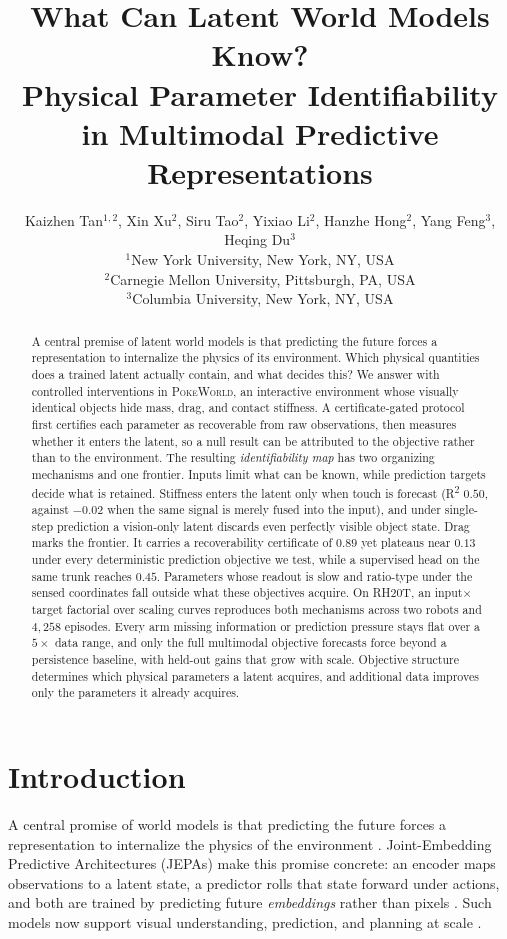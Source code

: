 \documentclass{article} %
\title{What Can Latent World Models Know? \\ Physical Parameter Identifiability \\ in Multimodal Predictive Representations}
\author{Kaizhen Tan$^{1,2}$, Xin Xu$^{2}$, Siru Tao$^{2}$, Yixiao Li$^{2}$,
Hanzhe Hong$^{2}$, Yang Feng$^{3}$, Heqing Du$^{3}$ \\
$^{1}$New York University, New York, NY, USA \\
$^{2}$Carnegie Mellon University, Pittsburgh, PA, USA \\
$^{3}$Columbia University, New York, NY, USA}
\newcommand{\pokeworld}{\textsc{PokeWorld}}
\begin{document}
\maketitle

\begin{abstract}
A central premise of latent world models is that predicting the future
forces a representation to internalize the physics of its environment.
Which physical quantities does a trained latent actually contain, and what
decides this? We answer with controlled interventions in \pokeworld{}, an
interactive environment whose visually identical objects hide mass, drag,
and contact stiffness. A certificate-gated protocol first certifies each
parameter as recoverable from raw observations, then measures whether it
enters the latent, so a null result can be attributed to the objective
rather than to the environment. The resulting \emph{identifiability map}
has two organizing mechanisms and one frontier. Inputs limit what can be
known, while prediction targets decide what is retained. Stiffness enters
the latent only when touch is forecast (R\textsuperscript{2} $0.50$,
against $-0.02$ when the same signal is merely fused into the input), and
under single-step prediction a vision-only latent discards even perfectly
visible object state. Drag marks the frontier. It carries a recoverability
certificate of $0.89$ yet plateaus near $0.13$ under every deterministic
prediction objective we test, while a supervised head on the same trunk
reaches $0.45$. Parameters whose readout is slow and ratio-type under the
sensed coordinates fall outside what these objectives acquire. On RH20T,
an input$\times$target factorial over scaling curves reproduces both
mechanisms across two robots and $4{,}258$ episodes. Every arm missing
information or prediction pressure stays flat over a $5\times$ data range,
and only the full multimodal objective forecasts force beyond a
persistence baseline, with held-out gains that grow with scale. Objective
structure determines which physical parameters a latent acquires, and
additional data improves only the parameters it already acquires.
\end{abstract}

\section{Introduction}
\label{sec:intro}

A central promise of world models is that predicting the future forces a
representation to internalize the physics of the environment
\citep{lecun2022path,hafner2023dreamerv3,assran2025vjepa2}. Joint-Embedding
Predictive Architectures (JEPAs) make this promise concrete: an encoder maps
observations to a latent state, a predictor rolls that state forward under actions,
and both are trained by predicting future \emph{embeddings} rather than pixels
\citep{assran2023ijepa,balestriero2025lejepa,maes2026lewm}. Such models now support
visual understanding, prediction, and planning at scale
\citep{assran2025vjepa2,zhou2024dinowm}.
\end{document}
